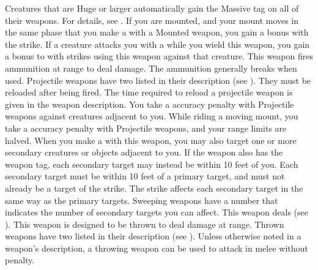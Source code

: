         Creatures that are Huge or larger automatically gain the Massive tag on all of their weapons.
        For details, see .
        \label{Mounted Weapon} If you are mounted, and your mount moves in the same phase that you make a  with a Mounted weapon, you gain a   bonus with the strike.
         If a creature attacks you with a   while you wield this weapon, you  gain a  bonus to  with strikes using this weapon against that creature.
         This weapon fires ammunition at range to deal damage.
        The ammunition generally breaks when used.
        Projectile weapons have two  listed in their description (see ).
        They must be reloaded after being fired.
        The time required to reload a projectile weapon is given in the weapon description.
        You take a  accuracy penalty with Projectile weapons against creatures adjacent to you.
        While riding a moving mount, you take a  accuracy penalty with Projectile weapons, and your range limits are halved.
        \label{Sweeping} When you make a   with this weapon, you may also target one or more secondary creatures or objects adjacent to you.
        If the weapon also has the  weapon tag, each secondary target may instead be within 10 feet of you.
        Each secondary target must be within 10 feet of a primary target, and must not already be a target of the strike.
        The strike affects each secondary target in the same way as the primary targets.
        Sweeping weapons have a number that indicates the number of secondary targets you can affect.
         This weapon deals  (see ).
         This weapon is designed to be thrown to deal damage at range.
        Thrown weapons have two  listed in their description (see ).
        Unless otherwise noted in a weapon's description, a throwing weapon can be used to attack in melee without penalty.

